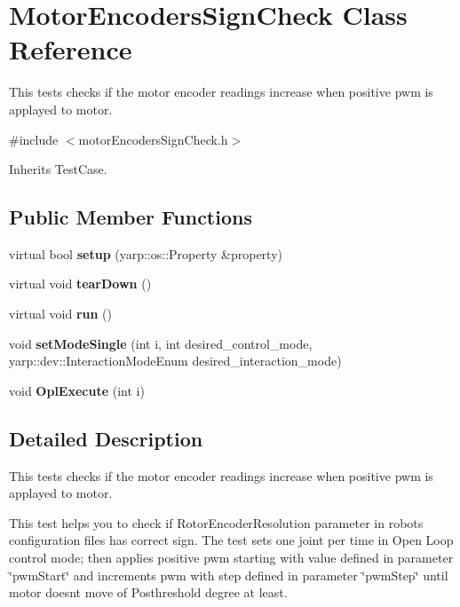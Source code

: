 \section{Motor\+Encoders\+Sign\+Check Class Reference}
\label{classMotorEncodersSignCheck}


This tests checks if the motor encoder readings increase when positive pwm is applayed to motor.  




{\ttfamily \#include $<$motor\+Encoders\+Sign\+Check.\+h$>$}



Inherits Test\+Case.

\subsection*{Public Member Functions}
\begin{DoxyCompactItemize}
\item 
\mbox{\label{classMotorEncodersSignCheck_a9473c20f3efe4b8fc2c554b6d12f65f9}} 
virtual bool {\bfseries setup} (yarp\+::os\+::\+Property \&property)
\item 
\mbox{\label{classMotorEncodersSignCheck_a706ce3dbc1073c90b2981ed55286a407}} 
virtual void {\bfseries tear\+Down} ()
\item 
\mbox{\label{classMotorEncodersSignCheck_ac1bb7e6d1b55c9e97c2432dd78f0c625}} 
virtual void {\bfseries run} ()
\item 
\mbox{\label{classMotorEncodersSignCheck_adc3e407539e8368936eed1749dc69317}} 
void {\bfseries set\+Mode\+Single} (int i, int desired\+\_\+control\+\_\+mode, yarp\+::dev\+::\+Interaction\+Mode\+Enum desired\+\_\+interaction\+\_\+mode)
\item 
\mbox{\label{classMotorEncodersSignCheck_aeb8969c7334373e30d409de1a4efb429}} 
void {\bfseries Opl\+Execute} (int i)
\end{DoxyCompactItemize}


\subsection{Detailed Description}
This tests checks if the motor encoder readings increase when positive pwm is applayed to motor. 

This test helps you to check if Rotor\+Encoder\+Resolution parameter in robot\textquotesingle{}s configuration files has correct sign. The test sets one joint per time in Open Loop control mode; then applies positive pwm starting with value defined in parameter \char`\"{}pwm\+Start\char`\"{} and increments pwm with step defined in parameter \char`\"{}pwm\+Step\char`\"{} until motor doesn\textquotesingle{}t move of Posthreshold degree at least.

